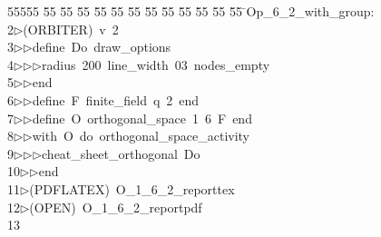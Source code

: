 %
%
\begin{tabbing}
55555 \= 55 \= 55 \= 55 \= 55 \= 55 \= 55 \= 55 \= 55 \= 55 \= 55 \= 55 \= 55 \= \>Op\_6\_2\_with\_group:\\[0pt]
2\>$\triangleright$\>(ORBITER)\ v\ 2\ \\[0pt]
3\>$\triangleright$\>$\triangleright$\>define\ Do\ draw\_options\ \\[0pt]
4\>$\triangleright$\>$\triangleright$\>$\triangleright$\>radius\ 200\ line\_width\ 03\ nodes\_empty\ \\[0pt]
5\>$\triangleright$\>$\triangleright$\>end\ \\[0pt]
6\>$\triangleright$\>$\triangleright$\>define\ F\ finite\_field\ q\ 2\ end\ \\[0pt]
7\>$\triangleright$\>$\triangleright$\>define\ O\ orthogonal\_space\ 1\ 6\ F\ end\ \\[0pt]
8\>$\triangleright$\>$\triangleright$\>with\ O\ do\ orthogonal\_space\_activity\ \\[0pt]
9\>$\triangleright$\>$\triangleright$\>$\triangleright$\>cheat\_sheet\_orthogonal\ Do\ \\[0pt]
10\>$\triangleright$\>$\triangleright$\>end\\[0pt]
11\>$\triangleright$\>(PDFLATEX)\ O\_1\_6\_2\_reporttex\ \\[0pt]
12\>$\triangleright$\>(OPEN)\ O\_1\_6\_2\_reportpdf\\[0pt]
13\>\end{tabbing}
